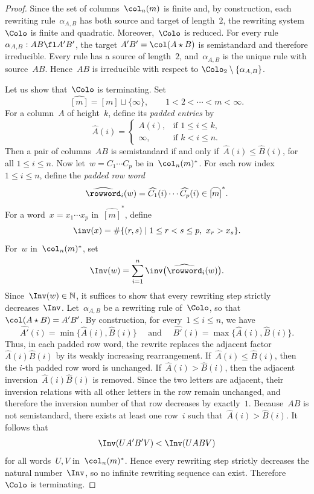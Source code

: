 \documentclass[a4paper, twoside, 11pt, english]{article}
\begin{document}
\begin{proof}
Since the set of columns~$\col_n(m)$ is finite and, by construction, each rewriting rule~$\alpha_{A,B}$ has both source and target of length~$2$, the rewriting system~$\Colo$ is finite and quadratic.
Moreover,~$\Colo$ is reduced. For every rule
$\alpha_{A,B}:AB\fl A'B'$, the target
$A'B'=\col(A\star B)$ is semistandard and therefore irreducible.
Every rule has a source of length~$2$, and~$\alpha_{A,B}$
is the unique rule with source~$AB$.
Hence~$AB$ is irreducible with respect to
$\Colo_2\setminus\{\alpha_{A,B}\}$.

Let us show that~$\Colo$ is terminating.
Set
\[
\widehat{[m]}=[m]\sqcup\{\infty\},
\qquad
1<2<\cdots<m<\infty .
\]
For a column~$A$ of height~$k$, define its \emph{padded entries} by
\[
\widehat{A}(i)=
\begin{cases}
A(i), & \text{if } 1\le i\le k,\\
\infty, & \text{if } k<i\le n.
\end{cases}
\]
Then a pair of columns~$AB$ is semistandard if and only if~$\widehat{A}(i)\le \widehat{B}(i)$, for all  $1\le i\le n$.
Now let~$w=C_1\cdots C_p$ be in~$\col_n(m)^\ast$.
For each row index~$1\le i\le n$, define the \emph{padded row word}
\[
\widehat{\rowword}_i(w)
=
\widehat{C_1}(i)\cdots \widehat{C_p}(i)
\in \widehat{[m]}^\ast.
\]
For a word~$x=x_1\cdots x_p$ in~$\widehat{[m]}^\ast$, define
\[
\inv(x)
=
\#\{(r,s)\mid 1\le r<s\le p,\ x_r>x_s\}.
\]
For~$w$ in~$\col_n(m)^\ast$, set
\[
\Inv(w)
=
\sum_{i=1}^{n}\inv\bigl(\widehat{\rowword}_i(w)\bigr).
\]
Since~$\Inv(w)\in\mathbb N$, it suffices to show that every rewriting step strictly decreases~$\Inv$.
Let~$\alpha_{A,B}$ be a rewriting rule of~$\Colo$, so that~$\col(A\star B)=A'B'$.
By construction, for every~$1\le i\le n$, we have
\[
\widehat{A'}(i)=\min\{\widehat{A}(i),\widehat{B}(i)\}\quad\text{ and }\quad \widehat{B'}(i)=\max\{\widehat{A}(i),\widehat{B}(i)\}.
\]
Thus, in each padded row word, the rewrite replaces the adjacent factor~$\widehat{A}(i)\widehat{B}(i)$
by its weakly increasing rearrangement.
If~$\widehat{A}(i)\le \widehat{B}(i)$, then the $i$-th padded row word is unchanged.
If~$\widehat{A}(i)>\widehat{B}(i)$, then the adjacent inversion~$\widehat{A}(i)\widehat{B}(i)$
is removed. Since the two letters are adjacent, their inversion relations with all other letters in the row remain unchanged, and therefore the inversion number of that row decreases by exactly~$1$.
Because~$AB$ is not semistandard, there exists at least one row~$i$ such that~$\widehat{A}(i)>\widehat{B}(i)$.
It follows that
\[
\Inv(UA'B'V)<\Inv(UABV)
\]
for all words~$U,V$ in~$\col_n(m)^\ast$.
Hence every rewriting step strictly decreases the natural number~$\Inv$, so no infinite rewriting sequence can exist.
Therefore~$\Colo$ is terminating.


\end{proof}
\end{document}
